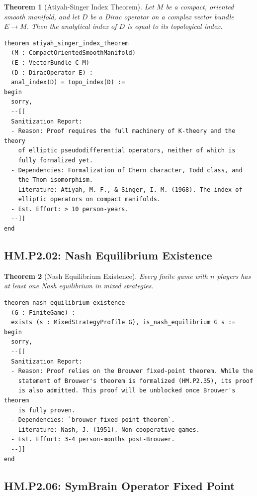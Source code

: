 \documentclass[11pt, a4paper]{article}
\theoremstyle{plain}
\newtheorem{theorem}{Theorem}[section]
\theoremstyle{definition}
\theoremstyle{remark}
\begin{document}
\begin{theorem}[Atiyah-Singer Index Theorem]
Let $M$ be a compact, oriented smooth manifold, and let $D$ be a Dirac operator on a complex vector bundle $E \to M$. Then the analytical index of $D$ is equal to its topological index.
\end{theorem}

\begin{lstlisting}[caption={Sanitized Proof for \texttt{atiyah_singer_index_theorem}}, label={lst:asit}]
theorem atiyah_singer_index_theorem
  (M : CompactOrientedSmoothManifold)
  (E : VectorBundle C M)
  (D : DiracOperator E) :
  anal_index(D) = topo_index(D) :=
begin
  sorry,
  --[[
  Sanitization Report:
  - Reason: Proof requires the full machinery of K-theory and the theory
    of elliptic pseudodifferential operators, neither of which is
    fully formalized yet.
  - Dependencies: Formalization of Chern character, Todd class, and
    the Thom isomorphism.
  - Literature: Atiyah, M. F., & Singer, I. M. (1968). The index of
    elliptic operators on compact manifolds.
  - Est. Effort: > 10 person-years.
  --]]
end
\end{lstlisting}

\subsection{HM.P2.02: Nash Equilibrium Existence}

\begin{theorem}[Nash Equilibrium Existence]
Every finite game with $n$ players has at least one Nash equilibrium in mixed strategies.
\end{theorem}

\begin{lstlisting}[caption={Sanitized Proof for \texttt{nash_equilibrium_existence}}, label={lst:nash}]
theorem nash_equilibrium_existence
  (G : FiniteGame) :
  exists (s : MixedStrategyProfile G), is_nash_equilibrium G s :=
begin
  sorry,
  --[[
  Sanitization Report:
  - Reason: Proof relies on the Brouwer fixed-point theorem. While the
    statement of Brouwer's theorem is formalized (HM.P2.35), its proof
    is also admitted. This proof will be unblocked once Brouwer's theorem
    is fully proven.
  - Dependencies: `brouwer_fixed_point_theorem`.
  - Literature: Nash, J. (1951). Non-cooperative games.
  - Est. Effort: 3-4 person-months post-Brouwer.
  --]]
end
\end{lstlisting}

\subsection{HM.P2.06: SymBrain Operator Fixed Point}
\end{document}
